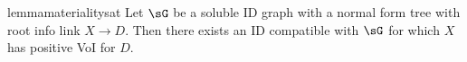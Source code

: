 







\begin{restatable}{lemma}{materialitysat}  \label{le:aug23.3v2-materiality-model-on-nf-tree-has-materiality}
Let $\sG$ be a soluble ID graph with a normal form tree with root info link $X\to D$. Then there exists an 
ID
compatible with $\sG$ for which $X$ has positive VoI for $D$.~
\end{restatable}
